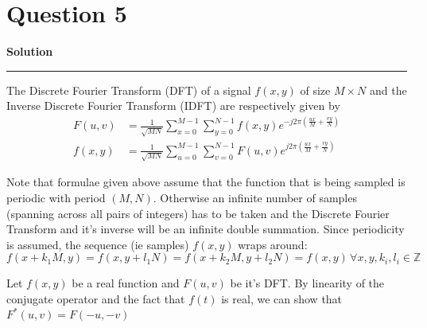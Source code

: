\documentclass[a4paper]{article}
\title{\cooltitle{CS663 Assignment-3}}
\author{{\bf Saksham Rathi, Kavya Gupta, Shravan Srinivasa Raghavan} \\
\small Department of Computer Science, \\
Indian Institute of Technology Bombay \\}
\date{}
\newenvironment{solution}[2][]{%
    \begin{mdframed}[linecolor=green!60!black, linewidth=2pt, roundcorner=10pt, backgroundcolor=green!5!white, skipabove=12pt, skipbelow=12pt]%
        \textbf{\large #2} %
        \par\noindent\rule{\textwidth}{0.4pt} %
        \vspace{0.5em} %
}{%
    \end{mdframed}%
}
\begin{document}
\maketitle
\section*{Question 5}

\begin{solution}{Solution}
  The Discrete Fourier Transform (DFT) of a signal $f(x,y)$ of size $M \times N$ and the 
  Inverse Discrete Fourier Transform (IDFT) are respectively given by 
  \begin{align*}
    F(u,v) &= \frac{1}{\sqrt{MN}}\sum\limits_{x = 0}^{M - 1}\sum\limits_{y = 0}^{N - 1} f(x,y) e^{-j2\pi \left(\frac{ux}{M} + \frac{vy}{N}\right)}  \\  
    f(x,y) &= \frac{1}{\sqrt{MN}}\sum\limits_{u = 0}^{M - 1}\sum\limits_{v = 0}^{N - 1} F(u,v) e^{j2\pi \left(\frac{ux}{M} + \frac{vy}{N}\right)}
  \end{align*}

  Note that formulae given above assume that the function that is being sampled is periodic with period $(M,N)$. Otherwise 
  an infinite number of samples (spanning across all pairs of integers) has to be taken and the Discrete Fourier Transform and 
  it's inverse will be an infinite double summation. Since periodicity is assumed, the sequence (ie samples) $f(x,y)$ wraps 
  around: \[f(x + k_{1}M,y) = f(x,y + l_{1}N) = f(x + k_{2}M,y + l_{2}N) = f(x,y) \, \forall x,y,k_{i},l_{i} \in \mathbb{Z}\]
  
  Let $f(x,y)$ be a real function and $F(u,v)$ be it's DFT\@. By linearity of the conjugate operator and the fact that $f(t)$ 
  is real, we can show that $F^{*}(u,v) = F(-u,-v)$
  

\end{solution}
\end{document}
